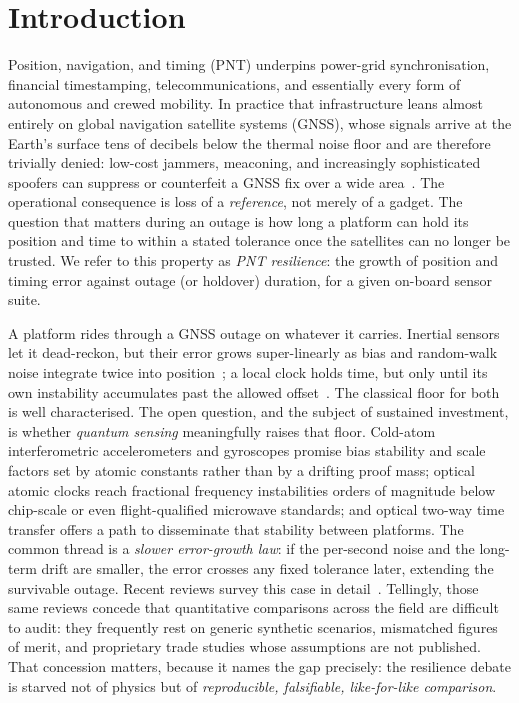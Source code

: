\section{Introduction}\label{sec:intro}

Position, navigation, and timing (PNT) underpins power-grid synchronisation,
financial timestamping, telecommunications, and essentially every form of
autonomous and crewed mobility. In practice that infrastructure leans almost
entirely on global navigation satellite systems (GNSS), whose signals arrive at
the Earth's surface tens of decibels below the thermal noise floor and are
therefore trivially denied: low-cost jammers, meaconing, and increasingly
sophisticated spoofers can suppress or counterfeit a GNSS fix over a wide
area~\citep{misra2010,kaplan2017}. The operational consequence is loss of a
\emph{reference}, not merely of a gadget. The question that matters during an
outage is how long a platform can hold its position and time to within a stated
tolerance once the satellites can no longer be trusted. We refer to this
property as \emph{PNT resilience}: the growth of position and timing error
against outage (or holdover) duration, for a given on-board sensor suite.

A platform rides through a GNSS outage on whatever it carries. Inertial sensors
let it dead-reckon, but their error grows super-linearly as bias and
random-walk noise integrate twice into position~\citep{groves2013}; a local
clock holds time, but only until its own instability accumulates past the
allowed offset~\citep{riley2008nist}. The classical floor for both is well
characterised. The open question, and the subject of sustained investment, is
whether \emph{quantum sensing} meaningfully raises that floor. Cold-atom
interferometric accelerometers and gyroscopes promise bias stability and scale
factors set by atomic constants rather than by a drifting proof mass; optical
atomic clocks reach fractional frequency instabilities orders of magnitude below
chip-scale or even flight-qualified microwave standards; and optical two-way
time transfer offers a path to disseminate that stability between platforms.
The common thread is a \emph{slower error-growth law}: if the per-second noise
and the long-term drift are smaller, the error crosses any fixed tolerance later,
extending the survivable outage. Recent reviews survey this case in
detail~\citep{coldatomnavreview2022,quantumpntreview2026}. Tellingly, those same
reviews concede that quantitative comparisons across the field are difficult to
audit: they frequently rest on generic synthetic scenarios, mismatched figures
of merit, and proprietary trade studies whose assumptions are not published.
That concession matters, because it names the gap precisely: the resilience
debate is starved not of physics but of \emph{reproducible, falsifiable,
like-for-like comparison}.

